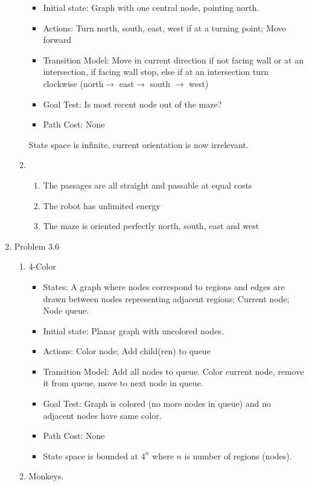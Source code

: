 \documentclass[10pt]{article}
\begin{document}
\begin{enumerate}
\begin{enumerate}
\begin{itemize}
    \item Initial state: Graph with one central node, pointing north.
    \item Actions: Turn north, south, east, west if at a turning point; Move forward
    \item Transition Model: Move in current direction if not facing wall or at an intersection, if facing wall stop, else if at an intersection turn clockwise (north$\rightarrow$ east$\rightarrow$ south 
      $\rightarrow$ west)
    \item Goal Test: Is most recent node out of the maze?
    \item Path Cost: None
    \end{itemize}  
    State space is infinite, current orientation is now irrelevant.
  \item
    \begin{enumerate}
    \item The passages are all straight and passable at equal costs
    \item The robot has unlimited energy
    \item The maze is oriented perfectly north, south, east and west
    \end{enumerate}
  \end{enumerate}
\item Problem 3.6 
 \begin{enumerate}
  \item 4-Color
    \begin{itemize}
    \item States: A graph where nodes correspond to regions and edges are drawn between nodes representing adjacent regions; Current node; Node queue.
    \item Initial state: Planar graph with uncolored nodes.
    \item Actions: Color node; Add child(ren) to queue
    \item Transition Model: Add all nodes to queue. Color current node, remove it from queue, move to next node in queue.
    \item Goal Test: Graph is colored (no more nodes in queue) and no adjacent nodes have same color.
    \item Path Cost: None
    \item State space is bounded at $4^n$ where $n$ is number of regions (nodes).
    \end{itemize}  
  \item Monkeys.
    \begin{itemize}

\end{itemize}
\end{enumerate}
\end{enumerate}
\end{document}
